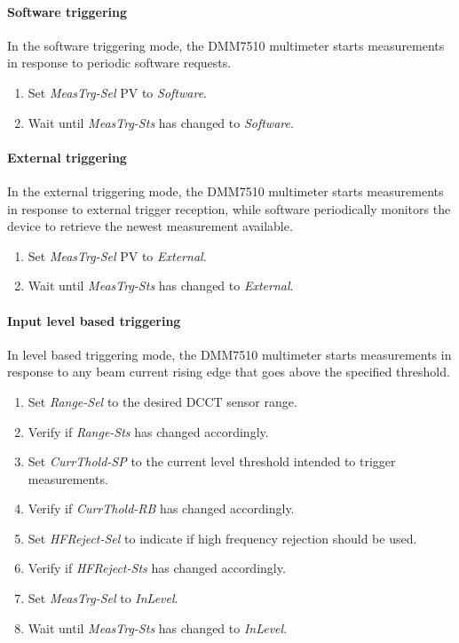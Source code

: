 \documentclass[openany]{article}
\begin{document}
		\paragraph{Software triggering} In the software triggering mode, the DMM7510 multimeter starts measurements in response to periodic software requests.

			\begin{enumerate}
				\item Set \emph{MeasTrg-Sel} PV to \emph{Software}.
				\item Wait until \emph{MeasTrg-Sts} has changed to \emph{Software}.
			\end{enumerate}

		\paragraph{External triggering} In the external triggering mode, the DMM7510 multimeter starts measurements in response to external trigger reception, while software periodically monitors the device to retrieve the newest measurement available.

			\begin{enumerate}
				\item Set \emph{MeasTrg-Sel} PV to \emph{External}.
				\item Wait until \emph{MeasTrg-Sts} has changed to \emph{External}.
			\end{enumerate}

		\paragraph{Input level based triggering} In level based triggering mode, the DMM7510 multimeter starts measurements in response to any beam current rising edge that goes above the specified threshold.

			\begin{enumerate}
				\item Set \emph{Range-Sel} to the desired DCCT sensor range.
				\item Verify if \emph{Range-Sts} has changed accordingly.
				\item Set \emph{CurrThold-SP} to the current level threshold intended to trigger measurements.
				\item Verify if \emph{CurrThold-RB} has changed accordingly.
				\item Set \emph{HFReject-Sel} to indicate if high frequency rejection should be used.
				\item Verify if \emph{HFReject-Sts} has changed accordingly.
				\item Set \emph{MeasTrg-Sel} to \emph{InLevel}.
				\item Wait until \emph{MeasTrg-Sts} has changed to \emph{InLevel}.
			\end{enumerate}
\end{document}

